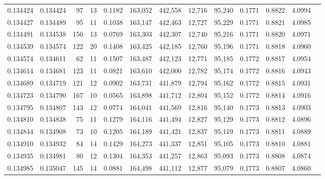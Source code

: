 \begin{tabular}{rrrrrrrrrrrrr}
0.134424 & 0.134424 &    97 &  13 &                                     0.1182 & 163,052 & 442,558 &  12,716 &  95,240 & 0.1771 & 0.8822 & 4.0994 \\
0.134427 & 0.134489 &    95 &  11 &                                     0.1038 & 163,147 & 442,463 &  12,727 &  95,229 & 0.1771 & 0.8821 & 4.0985 \\
0.134491 & 0.134538 &   156 &  13 &                                     0.0769 & 163,303 & 442,307 &  12,740 &  95,216 & 0.1771 & 0.8820 & 4.0971 \\
0.134539 & 0.134574 &   122 &  20 &                                     0.1408 & 163,425 & 442,185 &  12,760 &  95,196 & 0.1771 & 0.8818 & 4.0960 \\
0.134574 & 0.134611 &    62 &  11 &                                     0.1507 & 163,487 & 442,123 &  12,771 &  95,185 & 0.1772 & 0.8817 & 4.0954 \\
0.134614 & 0.134681 &   123 &  11 &                                     0.0821 & 163,610 & 442,000 &  12,782 &  95,174 & 0.1772 & 0.8816 & 4.0943 \\
0.134689 & 0.134719 &   121 &  12 &                                     0.0902 & 163,731 & 441,879 &  12,794 &  95,162 & 0.1772 & 0.8815 & 4.0931 \\
0.134723 & 0.134790 &   167 &  10 &                                     0.0565 & 163,898 & 441,712 &  12,804 &  95,152 & 0.1772 & 0.8814 & 4.0916 \\
0.134795 & 0.134807 &   143 &  12 &                                     0.0774 & 164,041 & 441,569 &  12,816 &  95,140 & 0.1773 & 0.8813 & 4.0903 \\
0.134810 & 0.134838 &    75 &  11 &                                     0.1279 & 164,116 & 441,494 &  12,827 &  95,129 & 0.1773 & 0.8812 & 4.0896 \\
0.134844 & 0.134908 &    73 &  10 &                                     0.1205 & 164,189 & 441,421 &  12,837 &  95,119 & 0.1773 & 0.8811 & 4.0889 \\
0.134910 & 0.134932 &    84 &  14 &                                     0.1429 & 164,273 & 441,337 &  12,851 &  95,105 & 0.1773 & 0.8810 & 4.0881 \\
0.134935 & 0.134981 &    80 &  12 &                                     0.1304 & 164,353 & 441,257 &  12,863 &  95,093 & 0.1773 & 0.8808 & 4.0874 \\
0.134985 & 0.135047 &   145 &  14 &                                     0.0881 & 164,498 & 441,112 &  12,877 &  95,079 & 0.1773 & 0.8807 & 4.0860 \\

\end{tabular}
